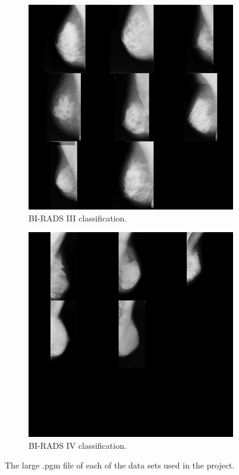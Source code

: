 \begin{figure}[H]
    \begin{subfigure}[t]{0.3\textwidth}
      \includegraphics[width=\textwidth]{Appendix5/sample3/big_scan_sample3.png}
      \caption{BI-RADS III classification.}
      \label{fig:app-sample3-input}
    \end{subfigure}
    \begin{subfigure}[t]{0.3\textwidth}
      \includegraphics[width=\textwidth]{Appendix5/sample4/big_scan_sample4.png}
      \caption{BI-RADS IV classification.}
      \label{fig:app-sample4-input}
    \end{subfigure}
    \caption{The large .pgm file of each of the data sets used in the project.}
    \label{fig:all-input-imgs}
\end{figure}

